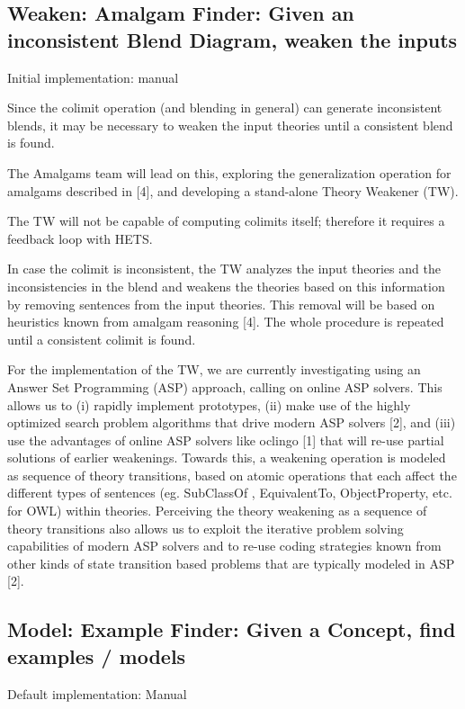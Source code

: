 \documentclass[10pt]{article}
\begin{document}
\subsection{Weaken: Amalgam Finder: Given an inconsistent Blend Diagram, weaken the inputs}

Initial implementation: manual

Since the colimit operation (and blending in general) can generate inconsistent blends, it may be necessary to weaken the input theories until a consistent blend is found. 

The Amalgams team will lead on this, exploring the generalization operation for amalgams described in [4], and developing a stand-alone Theory Weakener (TW).

The TW will not be capable of computing colimits itself; therefore it requires a feedback loop with HETS.

In case the colimit is inconsistent, the TW analyzes the input theories and the inconsistencies
in the blend and weakens the theories based on this information by removing sentences from the
input theories. This removal will be based on heuristics known from amalgam reasoning [4]. The whole procedure is repeated until a consistent colimit is found.

For the implementation of the TW, we are currently investigating using an 
Answer Set Programming (ASP) approach, calling on online ASP solvers. This allows us to (i) rapidly implement prototypes, 
(ii) make use of the highly optimized search problem algorithms that drive modern ASP solvers [2], and (iii) use the advantages of online ASP solvers like oclingo [1] that will re-use partial solutions of earlier weakenings. Towards this, a weakening operation is modeled as sequence of theory transitions, based on atomic operations that each affect the different types of sentences (eg. SubClassOf , EquivalentTo, ObjectProperty, etc. for OWL) within theories. Perceiving the theory weakening as a sequence of theory transitions also allows us to exploit the iterative problem solving capabilities of modern ASP solvers and to re-use coding strategies known from other kinds
of state transition based problems that are typically modeled in ASP [2].

\subsection{Model: Example Finder: Given a Concept, find examples / models}

Default implementation: Manual
\end{document}
